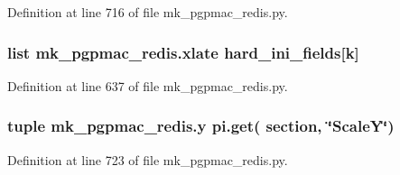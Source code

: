Definition at line 716 of file mk\-\_\-pgpmac\-\_\-redis.\-py.

\hypertarget{namespacemk__pgpmac__redis_afba647feb8fc4d0a364c3dca29af3a22}{
\subsubsection[{xlate}]{\setlength{\rightskip}{0pt plus 5cm}list mk\-\_\-pgpmac\-\_\-redis.\-xlate {\bf hard\-\_\-ini\-\_\-fields}\mbox{[}k\mbox{]}}}\label{namespacemk__pgpmac__redis_afba647feb8fc4d0a364c3dca29af3a22}


Definition at line 637 of file mk\-\_\-pgpmac\-\_\-redis.\-py.

\hypertarget{namespacemk__pgpmac__redis_a34220d58136fb95853f54ed51a130f79}{
\subsubsection[{y}]{\setlength{\rightskip}{0pt plus 5cm}tuple mk\-\_\-pgpmac\-\_\-redis.\-y pi.\-get( section, \char`\"{}Scale\-Y\char`\"{})}}\label{namespacemk__pgpmac__redis_a34220d58136fb95853f54ed51a130f79}


Definition at line 723 of file mk\-\_\-pgpmac\-\_\-redis.\-py.

